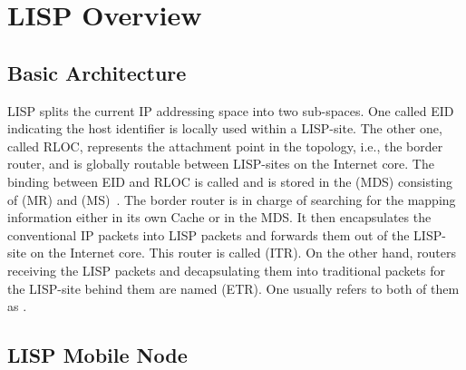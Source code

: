 \section{LISP Overview}\label{sec:lisp}


\subsection{Basic Architecture}\label{sec:archi}

LISP splits the current IP addressing space into two sub-spaces. One called EID
indicating the host identifier is locally used within a LISP-site. The other
one, called RLOC, represents the attachment point in the topology, i.e., the
border router, and is globally routable between LISP-sites on the Internet core.
The binding between EID and RLOC is called  and is
stored in the  (MDS) consisting of  (MR) and  (MS)~\cite{rfc6833}. The border router is in
charge of searching for the mapping information either in its own Cache or in
the MDS.  It then encapsulates the conventional IP packets into LISP packets and
forwards them out of the LISP-site on the Internet core.  This router is called
 (ITR).  On the other hand, routers receiving the
LISP packets and decapsulating them into traditional packets for the LISP-site
behind them are named  (ETR). One usually refers to
both of them as .


\subsection{LISP Mobile Node}\label{sec:lispMN}

